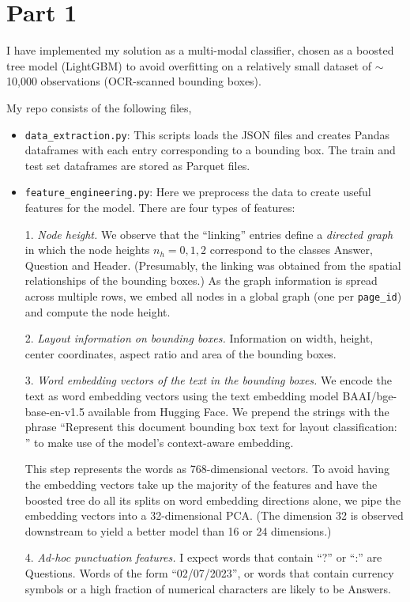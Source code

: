 \documentclass[11pt,a4paper]{article}
\numberwithin{equation}{section}
\begin{document}
\section{Part 1}

I have implemented my solution as a multi-modal classifier,
chosen as a boosted tree model (LightGBM) to avoid overfitting
on a relatively small dataset of $\sim$10,000 observations (OCR-scanned bounding boxes).

My repo consists of the following files,
\begin{itemize}
\item \texttt{data\_extraction.py}: This scripts loads the JSON files and creates
Pandas dataframes with each entry corresponding to a bounding box.
The train and test set dataframes are stored as Parquet files.

\item \texttt{feature\_engineering.py}: Here we preprocess the data to create
useful features for the model. There are four types of features:

1. \emph{Node height.} We observe that the ``linking'' entries define
a \emph{directed graph} in which the node heights $n_h=0,1,2$ correspond to
the classes Answer, Question and Header. (Presumably, the linking was obtained from
the spatial relationships of the bounding boxes.) As the graph information
is spread across multiple rows, we embed all nodes in a global graph
(one per \texttt{page\_id}) and compute the node height.

2. \emph{Layout information on bounding boxes.} Information on width, height,
center coordinates, aspect ratio and area of the bounding boxes.

3. \emph{Word embedding vectors of the text in the bounding boxes.}
We encode the text as word embedding vectors using the text embedding model
BAAI/bge-base-en-v1.5 available from Hugging Face.
We prepend the strings with the phrase ``Represent this document bounding box text for layout classification: ''
to make use of the model's context-aware embedding.

This step represents the words as 768-dimensional vectors. To avoid having the embedding vectors
take up the majority of the features and have the boosted tree do all its splits
on word embedding directions alone, we pipe the embedding vectors
into a 32-dimensional PCA. (The dimension 32 is observed downstream to yield
a better model than 16 or 24 dimensions.)

4. \emph{Ad-hoc punctuation features.} I expect words that contain ``?''
or ``:'' are Questions. Words of the form ``02/07/2023'', or words that contain currency symbols
or a high fraction of numerical characters are likely to be Answers.


\end{itemize}
\end{document}
